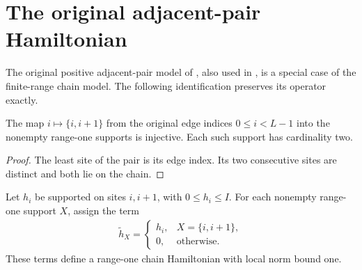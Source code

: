 \section{The original adjacent-pair Hamiltonian}
\label{sec:huang_positive_chain}

The original positive adjacent-pair model of \cite{Landau2015Polynomial}, also used
in \cite[Section~5.4]{Huang2015GroundState}, is a special case of the finite-range
chain model. The following identification preserves its operator exactly.

\begin{lemma}
    \label{thm:huang_adjacent_supports}
    \leanok
    The map $i\mapsto\{i,i+1\}$ from the original edge indices
    $0\le i<L-1$ into the nonempty range-one supports is injective. Each such
    support has cardinality two.
\end{lemma}
\begin{proof}
    \leanok
    The least site of the pair is its edge index. Its two consecutive sites are
    distinct and both lie on the chain.
\end{proof}

\begin{definition}
    \label{def:huang_positive_chain_hamiltonian}
    \leanok
    Let $h_i$ be supported on sites $i,i+1$, with $0\le h_i\le I$.
    For each nonempty range-one support $X$, assign the term
    \begin{align}
        \widetilde h_X=
        \begin{cases}
            h_i, & X=\{i,i+1\},      \\
            0,   & \text{otherwise}.
        \end{cases}
    \end{align}
    These terms define a range-one chain Hamiltonian with local norm bound one.
\end{definition}

